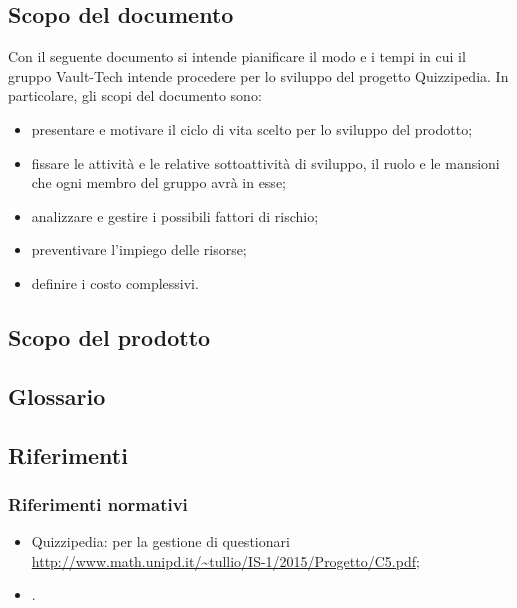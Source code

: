 \documentclass[a4paper, titlepage]{article}
\begin{document}
\subsection{Scopo del documento}
Con il seguente documento si intende pianificare il modo e i tempi in cui il gruppo Vault-Tech intende procedere per lo sviluppo del progetto Quizzipedia.
In particolare, gli scopi del documento sono:
\begin{itemize}
	\item presentare e motivare il ciclo di vita scelto per lo sviluppo del prodotto;
	\item fissare le attività e le relative sottoattività di sviluppo, il ruolo e le mansioni che ogni membro del gruppo avrà in esse;
	\item analizzare e gestire i possibili fattori di rischio;
	\item preventivare l'impiego delle risorse;
	\item definire i costo complessivi.
\end{itemize}


\subsection{Scopo del prodotto}
\SCOPO

\subsection{Glossario}
\GLOSSARIO
\subsection{Riferimenti}
\subsubsection{Riferimenti normativi}
\begin{itemize}
\item {} Quizzipedia:  per la gestione di questionari \url{http://www.math.unipd.it/~tullio/IS-1/2015/Progetto/C5.pdf};
\item {} .
\end{itemize}
\end{document}
